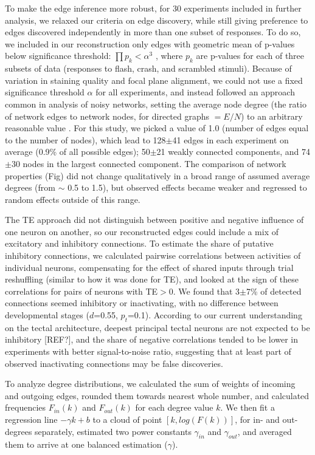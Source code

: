 \documentclass{article}
\begin{document}
To make the edge inference more robust, for 30 experiments included in further analysis, we relaxed our criteria on edge discovery, while still giving preference to edges discovered independently in more than one subset of responses. To do so, we included in our reconstruction only edges with geometric mean of p-values below significance threshold: $\prod{p_k}<\alpha^3$ , where $p_k$ are p-values for each of three subsets of data (responses to flash, crash, and scrambled stimuli). Because of variation in staining quality and focal plane alignment, we could not use a fixed significance threshold $\alpha$ for all experiments, and instead followed an approach common in analysis of noisy networks, setting the average node degree (the ratio of network edges to network nodes, for directed graphs $=E/N$) to an arbitrary reasonable value \citep{stetter2012te}. For this study, we picked a value of 1.0 (number of edges equal to the number of nodes), which lead to 128$\pm$41 edges in each experiment on average (0.9\% of all possible edges); 50$\pm$21 weakly connected components, and 74$\pm$30 nodes in the largest connected component. The comparison of network properties (Fig) did not change qualitatively in a broad range of assumed average degrees (from $\sim$ 0.5 to 1.5), but observed effects became weaker and regressed to random effects outside of this range.

The TE approach did not distinguish between positive and negative influence of one neuron on another, so our reconstructed edges could include a mix of excitatory and inhibitory connections. To estimate the share of putative inhibitory connections, we calculated pairwise correlations between activities of individual neurons, compensating for the effect of shared inputs through trial reshuffling (similar to how it was done for TE), and looked at the sign of these correlations for pairs of neurons with TE$>$0. We found that 3$\pm$7\% of detected connections seemed inhibitory or inactivating, with no difference between developmental stages ($d$=0.55, $p_t$=0.1). According to our current understanding on the tectal architecture, deepest principal tectal neurons are not expected to be inhibitory [REF?], and the share of negative correlations tended to be lower in experiments with better signal-to-noise ratio, suggesting that at least part of observed inactivating connections may be false discoveries.

To analyze degree distributions, we calculated the sum of weights of incoming and outgoing edges, rounded them towards nearest whole number, and calculated frequencies $F_{in}(k)$ and $F_{out}(k)$ for each degree value $k$. We then fit a regression line $-\gamma k + b$ to a cloud of point $[k , log(F(k)) ]$, for in- and out-degrees separately, estimated two power constants $\gamma_{in}$ and $\gamma_{out}$, and averaged them to arrive at one balanced estimation ($\gamma$).
\end{document}
